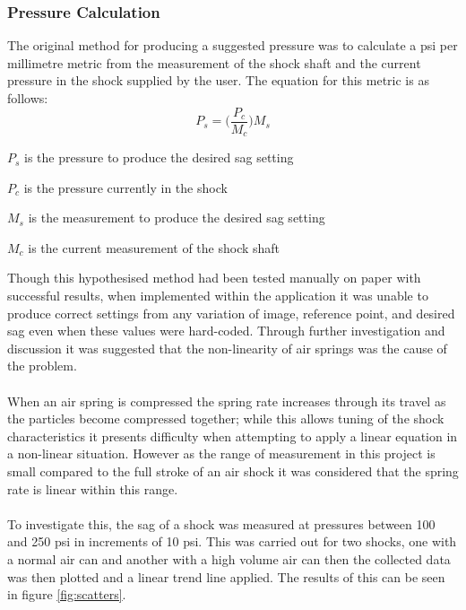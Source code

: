 	\subsubsection{Pressure Calculation}
		The original method for producing a suggested pressure was to calculate a psi per millimetre metric from the measurement of the shock shaft and the current pressure in the shock supplied by the user. The equation for this metric is as follows:
		\begin{equation}
			\label{equ:pxpermm}
			P_s = \Bigg(\frac{P_c}{M_c}\Bigg)M_s
		\end{equation}
		\begin{where}
			\item $P_s$ is the pressure to produce the desired sag setting
			\item $P_c$ is the pressure currently in the shock
			\item $M_s$ is the measurement to produce the desired sag setting
			\item $M_c$ is the current measurement of the shock shaft
		\end{where}
		\vspace{5mm}
		Though this hypothesised method had been tested manually on paper with successful results, when implemented within the application it was unable to produce correct settings from any variation of image, reference point, and desired sag even when these values were hard-coded. Through further investigation and discussion it was suggested that the non-linearity of air springs was the cause of the problem.
		\\\\
		When an air spring is compressed the spring rate increases through its travel as the particles become compressed together; while this allows tuning of the shock characteristics it presents difficulty when attempting to apply a linear equation in a non-linear situation. However as the range of measurement in this project is small compared to the full stroke of an air shock it was considered that the spring rate is linear within this range.
		\\\\
		To investigate this, the sag of a shock was measured at pressures between 100 and 250 psi in increments of 10 psi. This was carried out for two shocks, one with a normal air can and another with a high volume air can then the collected data was then plotted and a linear trend line applied. The results of this can be seen in figure \ref{fig:scatters}.
